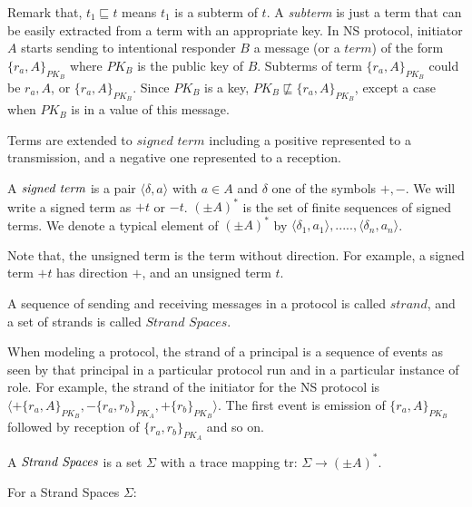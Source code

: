Remark that, $t_1\sqsubseteq t$ means $t_1$ is a subterm of $t$. A \textit{subterm} is just a term that can be easily extracted from a term with an appropriate key. In NS protocol, initiator $A$ starts sending to intentional responder $B$ a message (or a $term$) of the form $\{r_a,A\}_{PK_B}$ where $PK_B$ is the public key of $B$. Subterms of term $\{r_a,A\}_{PK_B}$ could be $r_a, A$, or $\{r_a,A\}_{PK_B}$. Since $PK_B$ is a key, $PK_B \not\sqsubseteq \{r_a,A\}_{PK_B}$, except a case when $PK_B$ is in a value of this message. 

Terms are extended to $\textit{signed term}$ including a positive represented to a transmission, and a negative one represented to a reception. 

\begin{Definition} A $\emph{signed term}$ is a pair $\langle\delta,a\rangle$ with $a \in A$ and $\delta$ one of the symbols $+,-$. We will write a signed term as $+t$ or $-t$. $(\pm A)^*$ is the set of finite sequences of signed terms. We denote a typical element of $(\pm A)^*$ by $\langle \delta_1,a_1\rangle,.....,\langle\delta_n,a_n\rangle$.
\end{Definition}

Note that, the unsigned term is the term without direction. For example, a signed term $+t$ has direction $+$, and an unsigned term $t$. 

A sequence of sending and receiving messages in a protocol is called $strand$, and a set of strands is called $\textit{Strand Spaces}$. 

When modeling a protocol, the strand of a principal is a sequence of events as seen by that principal in a particular protocol run and in a particular instance of role. For example, the strand of the initiator for the NS protocol is $\langle+\{r_a,A\}_{PK_B}, -\{r_a,r_b\}_{PK_A},+\{r_b\}_{PK_B} \rangle$. The first event is emission of $\{r_a,A\}_{PK_B}$ followed by reception of $\{r_a,r_b\}_{PK_A}$ and so on. 

\begin{Definition}
A $\emph{Strand Spaces}$ is a set $\Sigma$ with a trace mapping tr: $\Sigma \rightarrow (\pm A)^*$.
\end{Definition}

For a Strand Spaces $\Sigma$:

